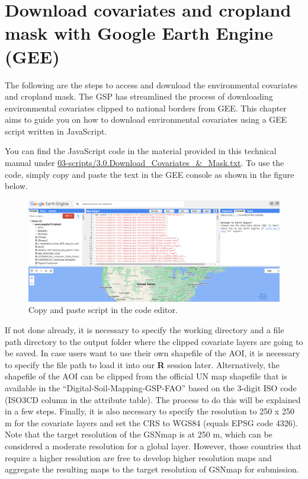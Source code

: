 \documentclass[
  10pt,
  b5paper,
  oneside]{book}
\begin{document}
\hypertarget{download-covariates-and-cropland-mask-with-google-earth-engine-gee}{%
\section{Download covariates and cropland mask with Google Earth Engine (GEE)}\label{download-covariates-and-cropland-mask-with-google-earth-engine-gee}}

The following are the steps to access and download the environmental covariates and cropland mask. The GSP has streamlined the process of downloading environmental covariates clipped to national borders from GEE. This chapter aims to guide you on how to download environmental covariates using a GEE script written in JavaScript.

You can find the JavaScript code in the material provided in this technical manual under \href{https://github.com/FAO-GSP/GSNmap-TM/tree/main/Digital-Soil-Mapping/03-Scripts}{03-scripts/3.0.Download\_Covariates\_\&\_Mask.txt}. To use the code, simply copy and paste the text in the GEE console as shown in the figure below.

\begin{figure}
\includegraphics[width=25.68in]{images/javaScript_GEE} \caption{Copy and paste script in the code editor.}\label{fig:screenshot}
\end{figure}

If not done already, it is necessary to specify the working directory and a file path directory to the output folder where the clipped covariate layers are going to be saved. In case users want to use their own shapefile of the AOI, it is necessary to specify the file path to load it into our \textbf{R} session later. Alternatively, the shapefile of the AOI can be clipped from the official UN map shapefile that is available in the ``Digital-Soil-Mapping-GSP-FAO'' based on the 3-digit ISO code (ISO3CD column in the attribute table). The process to do this will be explained in a few steps. Finally, it is also necessary to specify the resolution to 250 x 250 m for the covariate layers and set the CRS to WGS84 (equals EPSG code 4326). Note that the target resolution of the GSNmap is at 250 m, which can be considered a moderate resolution for a global layer. However, those countries that require a higher resolution are free to develop higher resolution maps and aggregate the resulting maps to the target resolution of GSNmap for submission.
\end{document}
